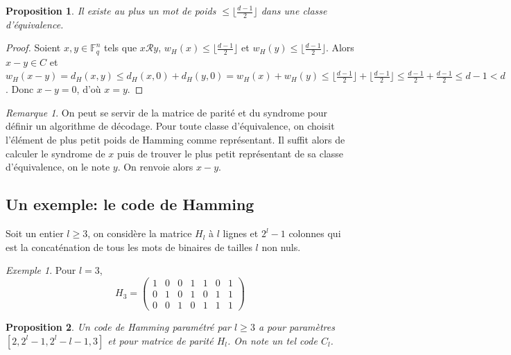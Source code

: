 \documentclass{article}
\newtheorem{proposition}{Proposition}
\theoremstyle{definition}
\theoremstyle{remark}
\newtheorem{remark}{Remarque}
\newtheorem{example}{Exemple}
\begin{document}
\begin{proposition}
    Il existe au plus un mot de poids $\le \lfloor \frac{d-1}{2} \rfloor$ dans une classe d'équivalence.
\end{proposition}

\begin{proof}
    Soient $x, y \in \mathbb{F}_q^n$ tels que $x \mathcal{R} y$, $w_H(x) \le \lfloor \frac{d-1}{2} \rfloor$ et $w_H(y) \le \lfloor \frac{d-1}{2} \rfloor$. Alors $x - y \in C$ et $w_H(x - y) = d_H(x, y) \le d_H(x, 0) + d_H(y, 0) = w_H(x) + w_H(y) \le  \lfloor \frac{d-1}{2} \rfloor + \lfloor \frac{d-1}{2} \rfloor \le \frac{d-1}{2} + \frac{d-1}{2} \le d - 1 < d$. Donc $x - y = 0$, d'où $x = y$. 
\end{proof}

\begin{remark}
    On peut se servir de la matrice de parité et du syndrome pour définir un algorithme de décodage. Pour toute classe d'équivalence, on choisit l'élément de plus petit poids de Hamming comme représentant. Il suffit alors de calculer le syndrome de $x$ puis de trouver le plus petit représentant de sa classe d'équivalence, on le note $y$. On renvoie alors $x - y$. 
\end{remark}

\subsection{Un exemple: le code de Hamming}
\label{subsec:lin-ham}

Soit un entier $l \ge 3$, on considère la matrice $H_l$ à $l$ lignes et $2^l - 1$ colonnes qui est la concaténation de tous les mots de binaires de tailles $l$ non nuls.

\begin{example}
    Pour $l = 3$,
    \[ H_3 = 
    \begin{pmatrix}
        1 & 0 & 0 & 1 & 1 & 0 & 1 \\
        0 & 1 & 0 & 1 & 0 & 1 & 1 \\
        0 & 0 & 1 & 0 & 1 & 1 & 1
    \end{pmatrix}
    \]
\end{example}

\begin{proposition}
\label{prop2}
    Un code de Hamming paramétré par $l \ge 3$ a pour paramètres $[2, 2^l - 1, 2^l -l - 1,3]$ et pour matrice de parité $H_l$. On note un tel code $C_l$.
\end{proposition}
\end{document}

